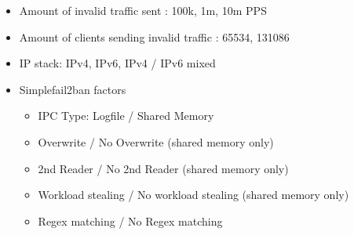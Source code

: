\begin{itemize}
	\item Amount of invalid traffic sent : 100k, 1m, 10m \ac{PPS}
	\item Amount of clients sending invalid traffic : 65534, 131086
	\item IP stack: \ac{IPv4}, \ac{IPv6}, \ac{IPv4} / \ac{IPv6} mixed
	\item Simplefail2ban factors 
	\begin{itemize}
		\item IPC Type: Logfile / Shared Memory
		\item Overwrite / No Overwrite (shared memory only)
		\item 2nd Reader / No 2nd Reader (shared memory only)
		\item Workload stealing / No workload stealing (shared memory only)
		\item \ac{Regex} matching / No \ac{Regex} matching
	\end{itemize}
\end{itemize}

